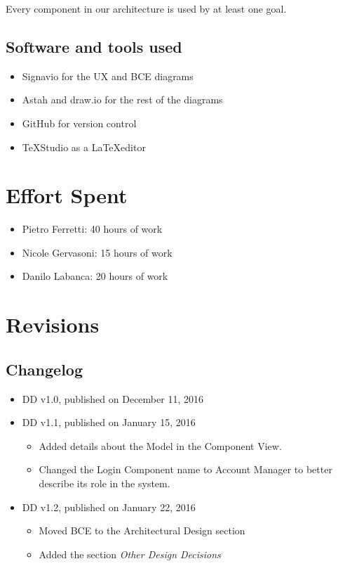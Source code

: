 \documentclass[english]{article}
\begin{document}
Every component in our architecture is used by at least one goal.

\newpage

\subsection{Software and tools used}
\begin{itemize}
	\item{Signavio for the UX and BCE diagrams}
	\item{Astah and draw.io for the rest of the diagrams}
	\item{GitHub for version control}
	\item{\TeX Studio as a \LaTeX editor}
	
\end{itemize}

\section{Effort Spent}
\begin{itemize}
	\item{Pietro Ferretti: 40 hours of work}
	\item{Nicole Gervasoni: 15 hours of work}
	\item{Danilo Labanca: 20 hours of work}
\end{itemize}


\section{Revisions}

\subsection{Changelog}
\begin{itemize}
	\item{DD v1.0, published on December 11, 2016}
	\item{DD v1.1, published on January 15, 2016
		\begin{itemize}
			\item{Added details about the Model in the Component View.}
			\item{Changed the Login Component name to Account Manager to better describe its role in the system.}
		\end{itemize} }
	\item{DD v1.2, published on January 22, 2016
		\begin{itemize}
			\item{Moved BCE to the Architectural Design section}
			\item{Added the section \textit{Other Design Decisions}}
		\end{itemize}}
\end{itemize}
\end{document}
